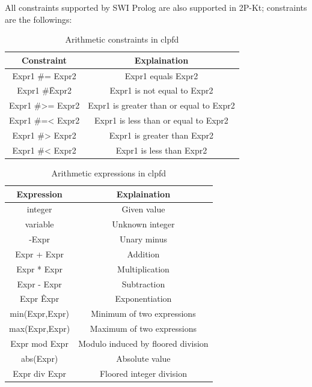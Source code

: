 All constraints supported by SWI Prolog are also supported in 2P-Kt; constraints are the followings:\newpage
\begin{center}
    \begin{table}
        \begin{tabular}{||c c ||} 
        \hline
        Constraint & Explaination \\ [0.5ex] 
        \hline\hline
        Expr1 \#= Expr2	& Expr1 equals Expr2 \\ 
        \hline
        Expr1 \#\= Expr2 & Expr1 is not equal to Expr2 \\
        \hline
        Expr1 \#>= Expr2 & Expr1 is greater than or equal to Expr2\\
        \hline
        Expr1 \#=< Expr2 & Expr1 is less than or equal to Expr2 \\
        \hline
        Expr1 \#> Expr2	& Expr1 is greater than Expr2 \\
        \hline
        Expr1 \#< Expr2	& Expr1 is less than Expr2 \\
        \hline
        \end{tabular}
        \label{table:arithmetic_constraints}
        \caption{Arithmetic constraints in clpfd}
    \end{table}    
\end{center}

\begin{center}
    \begin{table}
        \begin{tabular}{||c c ||} 
        \hline
        Expression & Explaination \\ [0.5ex] 
        \hline\hline
        integer	& Given value \\ 
        \hline
        variable & Unknown integer \\
        \hline
        -Expr & Unary minus\\
        \hline
        Expr + Expr	 & Addition \\
        \hline
        Expr * Expr	& Multiplication \\
        \hline
        Expr - Expr	& Subtraction \\
        \hline
        Expr \^ Expr& Exponentiation \\
        \hline
        min(Expr,Expr) & Minimum of two expressions \\
        \hline
        max(Expr,Expr) & Maximum of two expressions \\
        \hline
        Expr mod Expr & Modulo induced by floored division \\
        \hline
        abs(Expr) & Absolute value \\
        \hline
        Expr div Expr & Floored integer division \\
        \hline
        \end{tabular}
        \label{table:expressions_clp}
        \caption{Arithmetic expressions in clpfd}
    \end{table}    
\end{center}

